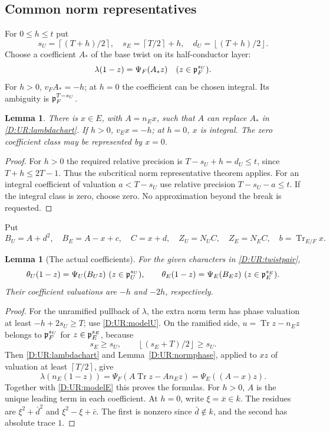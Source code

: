 \documentclass[11pt]{amsart}
\newtheorem{lemma}[theorem]{Lemma}
\theoremstyle{definition}
\theoremstyle{remark}
\newcommand{\Tr}{\operatorname{Tr}}
\newcommand{\ceil}[1]{\left\lceil #1\right\rceil}
\newcommand{\floor}[1]{\left\lfloor #1\right\rfloor}
\begin{document}
\subsection{Common norm representatives}
For $0\le h\le t$ put
\[
 s_U=\ceil{(T+h)/2},\quad s_E=\ceil{T/2}+h,\quad
 d_U=\floor{(T+h)/2}.
\]
Choose a coefficient $A_*$ of the base twist on its half-conductor layer:
\begin{equation}\label{D:UR:lambdachart}
 \lambda(1-z)=\Psi_F(A_*z)\quad(z\in\mathfrak p_F^{s_U}).
\end{equation}
For $h>0$, $v_FA_*=-h$; at $h=0$ the coefficient can be chosen integral.
Its ambiguity is $\mathfrak p_F^{T-s_U}$.
\begin{lemma}\label{D:UR:choosex}
There is $x\in E$, with $A=n_Ex$, such that $A$ can replace $A_*$ in
\eqref{D:UR:lambdachart}. If $h>0$, $v_Ex=-h$; at $h=0$, $x$ is integral.
The zero coefficient class may be represented by $x=0$.
\end{lemma}
\begin{proof}
For $h>0$ the required relative precision is
$T-s_U+h=d_U\le t$, since $T+h\le2T-1$. Thus the subcritical norm
representative theorem applies. For an integral coefficient of valuation
$a<T-s_U$ use relative precision $T-s_U-a\le t$. If the integral class
is zero, choose zero. No approximation beyond the break is requested.
\end{proof}
Put
\begin{equation}\label{D:UR:BCdefs}
 B_U=A+d^2,\quad B_E=A-x+c,\quad C=x+d,
 \quad Z_U=N_UC,\quad Z_E=N_EC,\quad b=\Tr_{E/F}x.
\end{equation}
\begin{lemma}[The actual coefficients]\label{D:UR:coeffs}
For the given characters in \eqref{D:UR:twistpair},
\begin{equation}\label{D:UR:actualcoeffs}
 \theta_U(1-z)=\Psi_U(B_Uz)\ (z\in\mathfrak p_U^{s_U}),\qquad
 \theta_E(1-z)=\Psi_E(B_Ez)\ (z\in\mathfrak p_E^{s_E}).
\end{equation}
Their coefficient valuations are $-h$ and $-2h$, respectively.
\end{lemma}
\begin{proof}
For the unramified pullback of $\lambda$, the extra norm term has phase
valuation at least $-h+2s_U\ge T$; use \eqref{D:UR:modelU}. On the ramified side,
$u=\Tr z-n_Ez$ belongs to $\mathfrak p_F^{s_U}$ for $z\in\mathfrak p_E^{s_E}$, because
\[
 s_E\ge s_U,\qquad \floor{(s_E+T)/2}\ge s_U.
\]
Then \eqref{D:UR:lambdachart} and Lemma~\ref{D:UR:normphase}, applied to $xz$ of
valuation at least $\ceil{T/2}$, give
\[
 \lambda(n_E(1-z))=\Psi_F(A\Tr z-A n_Ez)
                  =\Psi_E((A-x)z).
\]
Together with \eqref{D:UR:modelE} this proves the formulas. For $h>0$, $A$
is the unique leading term in each coefficient. At $h=0$, write
$\xi=\bar x\in k$. The residues are $\xi^2+\bar d^2$ and
$\xi^2-\xi+\bar c$. The first is nonzero since $\bar d\notin k$, and
the second has absolute trace $1$.
\end{proof}
\end{document}
